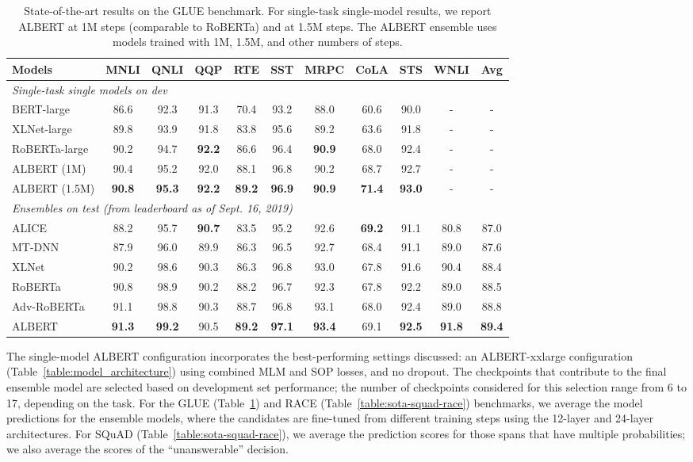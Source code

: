 \begin{table}[!htbp] 
\small
\centering
\begin{tabular}{ l   c c c c c c c c c c}
Models &MNLI	&QNLI	&QQP	&RTE	&SST	&MRPC	&CoLA	&STS	&WNLI	&Avg \\
\hline
\multicolumn{11}{l}{\textit{Single-task single models on dev}}\\
BERT-large	 &86.6	&92.3	&91.3	&70.4	&93.2	&88.0	&60.6	&90.0 &- &-	\\	
XLNet-large	 &89.8	&93.9	&91.8	&83.8	&95.6	&89.2	&63.6	&91.8 &- &-	\\	
RoBERTa-large&90.2	&94.7	&\textbf{92.2}	&86.6	&96.4	&\textbf{90.9}	&68.0	&92.4 &- &-	\\	
ALBERT (1M)   &90.4	&95.2	&92.0	&88.1	&96.8	&90.2	&68.7	&92.7 &- &-	\\
ALBERT (1.5M) &\textbf{90.8}	&\textbf{95.3}	&\textbf{92.2}	&\textbf{89.2}	&\textbf{96.9}	&\textbf{90.9}	&\textbf{71.4}	&\textbf{93.0} &- &-	\\	
\hline
\multicolumn{11}{l}{\textit{Ensembles on test (from leaderboard as of Sept. 16, 2019)}}\\
ALICE	    &88.2	&95.7	&\textbf{90.7}	&83.5	&95.2	&92.6	&\textbf{69.2}	&91.1	&80.8	&87.0 \\
MT-DNN	    &87.9	&96.0	&89.9	&86.3	&96.5	&92.7	&68.4	&91.1	&89.0	&87.6 \\
XLNet	    &90.2	&98.6	&90.3	&86.3	&96.8	&93.0	&67.8	&91.6	&90.4	&88.4 \\
RoBERTa	    &90.8	&98.9	&90.2	&88.2	&96.7	&92.3	&67.8	&92.2	&89.0	&88.5 \\
Adv-RoBERTa	&91.1	&98.8	&90.3	&88.7	&96.8	&93.1	&68.0	&92.4	&89.0	&88.8 \\
ALBERT 	    &\textbf{91.3}	&\textbf{99.2}	&90.5	&\textbf{89.2}	&\textbf{97.1}	&\textbf{93.4}	&69.1	&\textbf{92.5}	&\textbf{91.8}	&\textbf{89.4} \\
\end{tabular}
\caption{State-of-the-art results on the GLUE benchmark.
For single-task single-model results, we report ALBERT at 1M steps (comparable to RoBERTa) and at 1.5M steps. The ALBERT ensemble uses models trained with 1M, 1.5M, and other numbers of steps.}
\label{table:glue}
\end{table}


The single-model ALBERT configuration incorporates the best-performing settings discussed: an ALBERT-xxlarge configuration (Table~\ref{table:model_architecture}) using combined MLM and SOP losses, and no dropout. 
The checkpoints that contribute to the final ensemble model are selected based on development set performance; the number of checkpoints considered for this selection range from 6 to 17, depending on the task. 
For the GLUE (Table~\ref{table:glue}) and RACE (Table~\ref{table:sota-squad-race}) benchmarks, we average the model predictions for the ensemble models, where the candidates are fine-tuned from different training steps using the 12-layer and 24-layer architectures.
For SQuAD (Table~\ref{table:sota-squad-race}), we average the prediction scores for those spans that have multiple probabilities; we also average the scores of the ``unanswerable'' decision.

